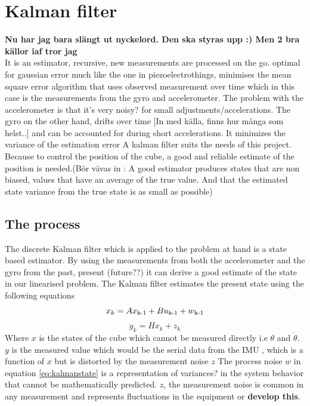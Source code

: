 \documentclass[a4paper,11pt]{kth-mag}
\begin{document}
\section{Kalman filter}
\textbf{Nu har jag bara slängt ut nyckelord. Den ska styras upp :) Men 2 bra källor iaf tror jag}  \\
It is an estimator, recursive, new measurements are processed on the go. optimal for gaussian error much like the one in piezoelectrothings, minimises the mean square error
algorithm that uses observed measurement over time which in this case is the measurements from the gyro and accelerometer. The problem with the accelerometer is that it's very noisy? for small adjustments/accelerations. The gyro on the other hand, drifts over time [In med källa, finns hur många som helst..] and can be accounted for during short accelerations.  \cite{Simon2001}
\cite{Kalmanintro} It minimizes the variance of the estimation error
A kalman filter suits the needs of this project. Because to control the position of the cube, a good and reliable estimate of the position is needed.(Bör vävas in : A good estimator produces states that are non biased, values that have an average  of the true value. And that the estimated state variance from the true state is as small as possible)
\subsection{The process}
The discrete Kalman filter which is applied to the problem at hand is a state based estimator. By using the measurements from both the accelerometer and the gyro from the past, present (future??) it can derive a good estimate of the state in our linearised problem. The Kalman filter estimates the present state using the following equations
\begin{equation}\label{eq:kalmanstate}
x_k = Ax\textsubscript{k-1}+Bu\textsubscript{k-1}+w\textsubscript{k-1}
\end{equation}
\begin{equation}
y_k = Hx_k + z_k
\end{equation}
Where $x$ is the states of the cube which cannot be measured directly i.e $\theta$ and   $\dot{\theta}$. $y$ is the measured value which would be the serial data from the IMU 
, which is a function of $x$ but is distorted by the measurement noise $z$
The process noise $w$ in equation \eqref{eq:kalmanstate} is a representation of variances? in the system behavior that cannot be mathematically predicted. $z$, the measurement noise is common in any measurement and represents fluctuations in the equipment or \textbf{develop this}. 
\end{document}
